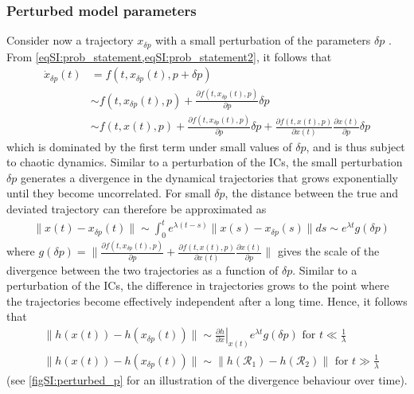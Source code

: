 \subsubsection{Perturbed model parameters}
Consider now a trajectory $x_{\delta p }$ with a small perturbation of the parameters $\delta p$ .
%
From \cref{eqSI:prob_statement,eqSI:prob_statement2}, it follows that
\begin{equation}
\begin{split}
	\dot{x}_{\delta p}(t) &= f(t, x_{\delta p}(t), p + \delta p) \\
	&\sim f(t, x_{\delta p}(t), p) + \frac{\partial f(t,x_{\delta p}(t), p)}{\partial p}\delta p\\
	&\sim f(t, x(t), p) + \frac{\partial f(t,x_{\delta p}(t), p)}{\partial p}\delta p
	+\frac{\partial f(t,x(t), p)}{\partial  x(t)}\frac{\partial x(t)}{\partial p}\delta p
\end{split}
\end{equation}
which is dominated by the first term under small values of $\delta p$, and is thus subject to chaotic dynamics.
% 
Similar to a perturbation of the ICs, the small perturbation $\delta p$ generates a divergence in the dynamical trajectories that grows exponentially until they become uncorrelated.
% 
For small $\delta p$, the distance between the true and deviated trajectory can therefore be approximated as
\begin{equation}
	\begin{aligned}
		&\|x(t) - x_{\delta p}(t)\| \sim 
		\int_{0}^{t} e^{\lambda (t-s)}\|x(s) - x_{\delta p}(s)\|ds \sim e^{\lambda t} g(\delta p)
	\end{aligned}
\end{equation}
where $g(\delta p) = \|\frac{\partial f(t,x_{\delta p}(t), p)}{\partial p}+\frac{\partial f(t,x(t), p)}{\partial  x(t)}\frac{\partial x(t)}{\partial p}\|$ gives the scale of the divergence between the two trajectories as a function of $\delta p$. %
% 
Similar to a perturbation of the ICs, the difference in trajectories grows to the point where the trajectories become effectively independent after a long time. Hence, it follows that
\begin{equation}\label{eqSI:divergenceTrajectoriesParameters}
\begin{aligned}
	&\|h(x(t)) - h(x_{\delta p}(t))\| \sim \left.\frac{\partial h}{\partial x}\right|_{x(t)} e^{\lambda t}g(\delta p) \text{    for }t\ll \frac{1}{\lambda}\\
	&\|h(x(t)) - h(x_{\delta p}(t))\| \sim \|h\left(\mathcal{R}_1\right) - h\left(\mathcal{R}_2\right) \| \text{    for }t\gg \frac{1}{\lambda}
\end{aligned}
\end{equation}
(see \cref{figSI:perturbed_p} for an illustration of the divergence behaviour over time).

